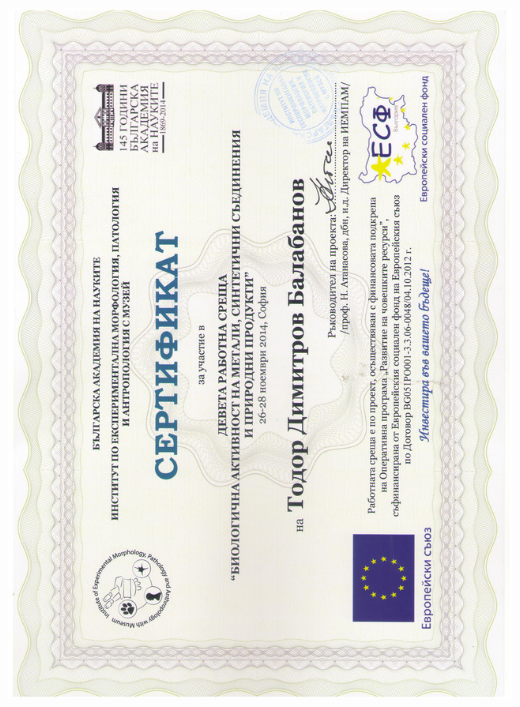 \documentclass[bulgarian,a4paper]{europasscv}
\begin{document}
\includegraphics[width=\textwidth,height=\textheight,keepaspectratio]{IEMPAM2014_4}
\end{document}
